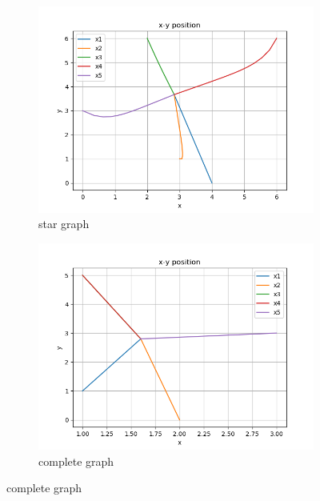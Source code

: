 \documentclass{article}
\begin{document}
\begin{problem}
\begin{figure}[!ht]
\begin{subfigure}{0.4\textwidth}
            \includegraphics[width=\textwidth]{./img/p1xyposition_star_graph_5.png}
            \caption{star graph}
        \end{subfigure}
        \begin{subfigure}{0.4\textwidth}
            \includegraphics[width=\textwidth]{./img/p1xyposition_complete_graph_5.png}
            \caption{complete graph}
        \end{subfigure}
    \end{figure}
    \begin{figure}
        \centering

\end{figure}
\end{problem}
\end{document}

